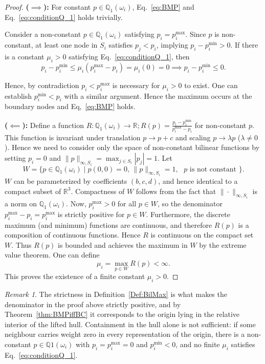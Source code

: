\documentclass[a4paper]{article}
\theoremstyle{plain}
\theoremstyle{definition}
\theoremstyle{remark}
\newtheorem{remark}[lemma]{Remark}
\begin{document}
\begin{proof}
\textbf{($\implies$):}
For constant $p\in \mathbb{Q}_1(\omega_i) $, Eq.~\eqref{eq:BMP} and Eq.~\eqref{eq:conditionQ_1} holds trivially.

Consider a non-constant $p \in \mathbb{Q}_1(\omega_i)$ satisfying $p_i = p_i^{\max}$. Since $p$ is non-constant, at least one node in $S_i$ satisfies $p_j < p_i$, implying $p_i - p_i^{\min} > 0$. If there is a constant $\mu_i > 0$ satisfying Eq.~\eqref{eq:conditionQ_1}, then 
$$
p_i - p_i^{\min} \le \mu_i (p_i^{\max} - p_i) = \mu_i (0) = 0 \implies p_i - p_i^{\min} \le 0.
$$

Hence, by contradiction $p_i < p_i^{\max}$ is necessary for $\mu_i > 0$ to exist. One can establish $p_i^{\min} < p_i$ with a similar argument. Hence the maximum occurs at the boundary nodes  and Eq,~\eqref{eq:BMP} holds.
	
\vspace{0.5em}

\textbf{($\impliedby$):}
Define a function $R:\mathbb{Q}_1(\omega_i)\rightarrow\mathbb{R}; R(p) = \frac{p_i - p_i^{\min}}{p_i^{\max} - p_i}$ for non-constant $p$. This function is invariant under translation $p \to p + c$ and scaling $p \to \lambda p$ ($\lambda\neq 0 $). Hence we need to consider only the space of non-constant bilinear functions by setting $p_i = 0$ and $\|p\|_{\infty,S_i} = \max_{j \in S_i} |p_j| = 1$. Let
$$
W = \{ p \in \mathbb{Q}_1(\omega_i) \mid p(0,0) = 0, \, \|p\|_{\infty,S_i} = 1, \text{ $p$ is not constant } \}.
$$
$W$ can be parameterized by coefficients $(b,c,d)$, and hence identical to a compact subset of $\mathbb{R}^3$. Compactness of $W$ follows from the fact that $\|\cdot \|_{\infty,S_i}$ is a norm on $\mathbb{Q}_1(\omega_i)$.  Now, $p_i^{\max} > 0$ for all $p \in W$, so the denominator $p_i^{\max} - p_i = p_i^{\max}$ is strictly positive for $p \in W$. Furthermore, the discrete maximum (and minimum) functions are continuous, and therefore $R(p)$ is a composition of continuous functions. Hence $R$ is continuous on the compact set $W$. Thus $R(p)$ is bounded and achieves the maximum in $W$ by the extreme value theorem. One can define
$$
\mu_i = \max_{p \in W} R(p) < \infty.
$$
This proves the existence of a finite constant $\mu_i > 0$.
\end{proof}

\begin{remark}
The strictness in Definition~\ref{Def:BilMax} is what makes the denominator in the proof above strictly positive, and by Theorem~\ref{thm:BMPiffBC} it corresponds to the origin lying in the relative interior of the lifted hull.  Containment in the hull alone is not sufficient: if some neighbour carries 	weight zero in every representation of the origin, there is a non-constant 	$p \in \mathbb{Q}1(\omega_i)$ with $p_i = p_i^{\max} = 0$ and $p_i^{\min} < 0$, and no finite $\mu_i$ satisfies	Eq.~\eqref{eq:conditionQ_1}.
\end{remark}
\end{document}
